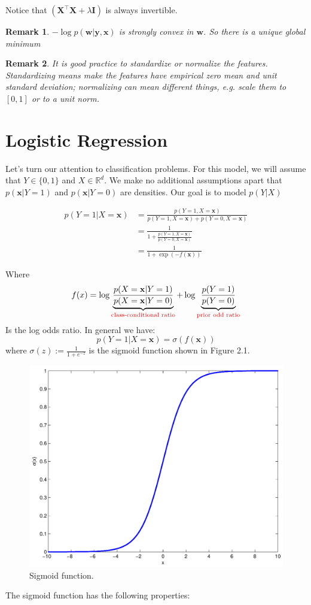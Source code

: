 \documentclass[12pt]{report}
\def\R{\mathbb{R}}
\newcommand{\defobj}[1]{\color{red}#1\color{black}{}}
\renewcommand{\emph}[1]{\color{violet}#1\color{black}{}}
\def\XX{\mathbf{X}}
\def\wb{\mathbf{w}}
\def\xb{\mathbf{x}}
\def\yb{\mathbf{y}}
\def\ts{\top}
\newtheorem{remark}{Remark}[section]
\begin{document}
Notice that $(\XX^{\ts}\XX + \lambda \mathbf{I})$ is always invertible.

\begin{remark}
    $-\log p(\wb|\yb, \xb)$ is \emph{strongly convex} in $\wb$. So there is a \emph{unique} global minimum
\end{remark}

\begin{remark}
    It is good practice to standardize or normalize the features. Standardizing means make the features have empirical zero mean and unit standard deviation; normalizing can mean different things, e.g. scale them to $[0,1]$ or to a unit norm.
\end{remark}

\section{Logistic Regression}
    Let's turn our attention to classification problems. For this model, we will assume that $Y \in \{0,1\}$ and $X \in \R^d$. We make no additional
    assumptions apart that $p(\xb|Y=1)$ and $p(\xb|Y=0)$ are densities. Our goal is to model $p(Y|X)$

    \begin{align*}
    p(Y=1 | X=\xb) &= \frac{p(Y=1,X=\xb)}{p(Y=1,X=\xb) + p(Y=0,X=\xb)} \\
     &= \frac{1}{1+\frac{p(Y=1,X=\xb)}{p(Y=0,X=\xb)}} \\
     &= \frac{1}{1+\exp(-f(\xb))}
    \end{align*}

    Where
    $$
       f(x) = \log \underbrace{\frac{p(X=\xb | Y=1)}{p(X=\xb | Y=0)}}_{\defobj{\text{class-conditional ratio} } } + \log \underbrace{\frac{p(Y=1)}{p(Y=0)}}_{\defobj{\text{prior odd ratio} } } 
    $$
    Is the \defobj{log odds ratio}. In general we have:
    $$p(Y=1|X=\xb) = \sigma(f(\xb))$$
    where $\sigma(z):= \frac{1}{1+e^{-z}}$ is the sigmoid function shown in Figure 2.1.

    \begin{figure}
    \begin{center}
    \includegraphics[width=.5\linewidth]{figures/sigmoid-eps-converted-to.pdf}
    \caption{\label{fig:sigmoid}Sigmoid function.}
    \end{center}
    \end{figure}
\pagebreak
    The sigmoid function has the following properties:
\end{document}
